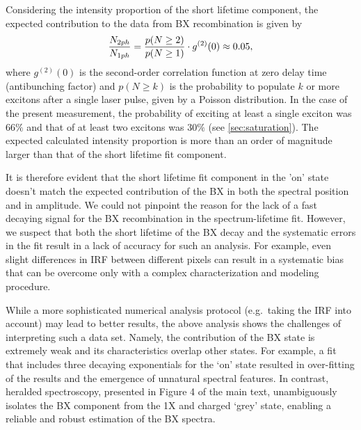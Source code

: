 \documentclass[journal=nalefd, manuscript=letter, layout=twocolumn]{achemso}
\begin{document}
Considering the intensity proportion of the short lifetime component, the expected contribution to the data from BX recombination is given by 
\begin{equation}
    \frac{N_{2ph}}{N_{1ph}} =
    \frac{p(N\geq 2)}{p(N\geq 1)}\cdot g^{(2)}(0) \approx \\ 0.05, 
\end{equation}
where $g^{(2)}(0)$ is the second-order correlation function at zero delay time (antibunching factor) and $p(N\geq k)$ is the probability to populate $k$ or more excitons after a single laser pulse, given by a Poisson distribution. In the case of the present measurement, the probability of exciting at least a single exciton was $66\%$ and that of at least two excitons was $30\%$ (see \autoref{sec:saturation}). The expected calculated intensity proportion is more than an order of magnitude larger than that of the short lifetime fit component.

It is therefore evident that the short lifetime fit component in the 'on' state doesn't match the expected contribution of the BX in both the spectral position and in amplitude. We could not pinpoint the reason for the lack of a fast decaying signal for the BX recombination in the spectrum-lifetime fit. However, we suspect that both the short lifetime of the BX decay and the systematic errors in the fit result in a lack of accuracy for such an analysis. For example, even slight differences in IRF between different pixels can result in a systematic bias that can be overcome only with a complex characterization and modeling procedure. 

While a more sophisticated numerical analysis protocol (e.g.\ taking the IRF into account) may lead to better results, the above analysis shows the challenges of interpreting such a data set. Namely, the contribution of the BX state is extremely weak and its characteristics overlap other states. For example, a fit that includes three decaying exponentials for the `on' state resulted in over-fitting of the results and the emergence of unnatural spectral features. In contrast, heralded spectroscopy, presented in Figure 4 of the main text, unambiguously isolates the BX component from the 1X and charged `grey' state, enabling a reliable and robust estimation of the BX spectra.
\end{document}
